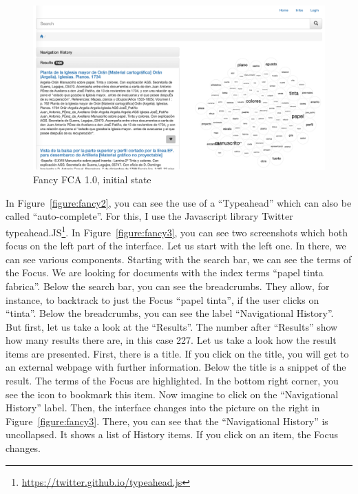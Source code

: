 \documentclass[11pt]{report}
\begin{document}
\begin{figure}[!ht]
	\centering
	\includegraphics[width=\linewidth]{images/fancy1}
\caption{Fancy FCA 1.0, initial state}
\label{figure:fancy1}
\end{figure}

 In Figure~\ref{figure:fancy2}, you can see the use of a ``Typeahead'' which can also be called ``auto-complete''. For this, I use the Javascript library Twitter typeahead.JS\footnote{\url{https://twitter.github.io/typeahead.js}}. In Figure~\ref{figure:fancy3}, you can see two screenshots which both focus on the left part of the interface. Let us start with the left one. In there, we can see various components. Starting with the search bar, we can see the terms of the Focus. We are looking for documents with the index terms ``papel tinta fabrica''. Below the search bar, you can see the breadcrumbs. They allow, for instance, to backtrack to just the Focus ``papel tinta'', if the user clicks on ``tinta''. Below the breadcrumbs, you can see the label ``Navigational History''. But first, let us take a look at the ``Results''. The number after ``Results'' show how many results there are, in this case 227. Let us take a look how the result items are presented. First, there is a title. If you click on the title, you will get to an external webpage with further information. Below the title is a snippet of the result. The terms of the Focus are highlighted. In the bottom right corner, you see the icon to bookmark this item. Now imagine to click on the ``Navigational History'' label. Then, the interface changes into the picture on the right in Figure~\ref{figure:fancy3}. There, you can see that the ``Navigational History'' is uncollapsed. It shows a list of History items. If you click on an item, the Focus changes. \\
 
\end{document}
